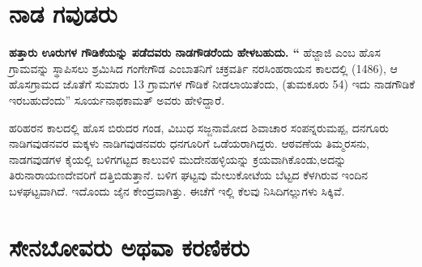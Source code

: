 \section{ನಾಡ ಗವುಡರು}

\textbf{ಹತ್ತಾರು ಊರುಗಳ ಗೌಡಿಕೆಯನ್ನು ಪಡೆದವರು ನಾಡಗೌಡರೆಂದು ಹೇಳಬಹುದು. “} ಹೆಜ್ಜಾಜಿ ಎಂಬ ಹೊಸ ಗ್ರಾಮವನ್ನು ಸ್ಥಾಪಿಸಲು ಶ್ರಮಿಸಿದ ಗಂಗೇಗೌಡ ಎಂಬಾತನಿಗೆ ಚಕ್ರವರ್ತಿ ನರಸಿಂಹರಾಯನ ಕಾಲದಲ್ಲಿ (1486), ಆ ಹೊಸಗ್ರಾಮದ ಜೊತೆಗೆ ಸುಮಾರು 13 ಗ್ರಾಮಗಳ ಗೌಡಿಕೆ ನೀಡಲಾಯಿತೆಂದು, (ತುಮಕೂರು 54) ಇದು ನಾಡಗೌಡಿಕೆ ಇರಬಹುದೆಂದು” ಸೂರ್ಯನಾಥಕಾಮತ್​ ಅವರು ಹೇಳಿದ್ದಾರೆ.

ಹರಿಹರನ ಕಾಲದಲ್ಲಿ ಹೊಸ ಬಿರುದರ ಗಂಡ, ವಿಬುಧ ಸಜ್ಜನಾಮೋದ ಶಿವಾಚಾರ ಸಂಪನ್ನರುಮಪ್ಪ, ದನಗೂರು ನಾಡಿಗವುಡ\-ನವರ ಮಕ್ಕಳು ನಾಡಿಗವುಡನವರು ಧನಗೂರಿಗೆ ಒಡೆಯರಾಗಿದ್ದರು. ಆಠವಣೆಯ ತಿಮ್ಮರಸನು, ನಾಡಗವುಡಗಳ ಕೈಯಲ್ಲಿ ಬಳಿಗಗಟ್ಟದ ಕಾಲುವಳಿ ಮುದೇನಹಳ್ಳಿಯನ್ನು ಕ್ರಯವಾಗಿಕೊಂಡು,ಅದನ್ನು ತಿರುನಾರಾಯಣದೇವರಿಗೆ ದತ್ತಿ\break ಬಿಡುತ್ತಾನೆ. ಬಳಿಗ ಘಟ್ಟವು ಮೇಲುಕೋಟೆಯ ಬೆಟ್ಟದ ಕೆಳಗಿರುವ ಇಂದಿನ ಬಳಘಟ್ಟವಾಗಿದೆ. ಇದೊಂದು ಜೈನ ಕೇಂದ್ರವಾಗಿತ್ತು. ಈಚೆಗೆ ಇಲ್ಲಿ ಕೆಲವು ನಿಸಿದಿಗಲ್ಲುಗಳು ಸಿಕ್ಕಿವೆ.


\section{ಸೇನಬೋವರು ಅಥವಾ ಕರಣಿಕರು}

